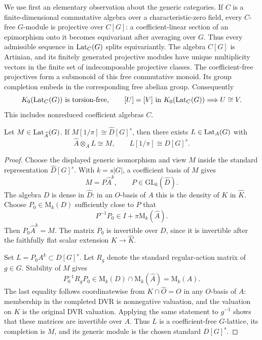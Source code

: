 We use first an elementary observation about the generic categories.
If $C$ is a finite-dimensional commutative algebra over a
characteristic-zero field, every $C$-free $G$-module is projective
over $C[G]$: a coefficient-linear section of an epimorphism onto it
becomes equivariant after averaging over $G$.  Thus every admissible
sequence in $\operatorname{Lat}_C(G)$ splits equivariantly.  The algebra $C[G]$
is Artinian, and its finitely generated projective modules have
unique multiplicity vectors in the finite set of indecomposable
projective classes.  The coefficient-free projectives form a
submonoid of this free commutative monoid.  Its group completion
embeds in the corresponding free abelian group.  Consequently
\begin{equation}\label{eq:completion-generic-cancellation}
 K_0(\operatorname{Lat}_C(G))\text{ is torsion-free},\qquad
 [U]=[V]\text{ in }K_0(\operatorname{Lat}_C(G))\Longrightarrow U\cong V.
\end{equation}
This includes nonreduced coefficient algebras $C$.

\begin{lemma}\label{lem:completion-generic-free-algebraization}
Let $M\in\operatorname{Lat}_{\widehat A}(G)$.  If
$M[1/\pi]\cong\widehat D[G]^s$, then there exists
$L\in\operatorname{Lat}_A(G)$ with
\[
 \widehat A\otimes_A L\cong M,
 \qquad L[1/\pi]\cong D[G]^s.
\]
\end{lemma}

\begin{proof}
Choose the displayed generic isomorphism and view $M$ inside the
standard representation $\widehat D[G]^s$.  With $k=s|G|$, a
coefficient basis of $M$ gives
\[
 M=P\widehat A^k,\qquad P\in\mathrm{GL}_k(\widehat D).
\]
The algebra $D$ is dense in $\widehat D$: in an $O$-basis of
$A$ this is the density of $K$ in $\widehat K$.  Choose
$P_0\in\mathrm M_k(D)$ sufficiently close to $P$ that
\[
 P^{-1}P_0\in I+\pi\mathrm M_k(\widehat A).
\]
Then $P_0\widehat A^k=M$.  The matrix $P_0$ is invertible over
$D$, since it is invertible after the faithfully flat scalar
extension $K\to\widehat K$.

Set $L=P_0A^k\subset D[G]^s$.  Let $R_g$ denote the standard
regular-action matrix of $g\in G$.  Stability of $M$ gives
\[
 P_0^{-1}R_gP_0\in\mathrm M_k(D)\cap
                         \mathrm M_k(\widehat A)
                       =\mathrm M_k(A).
\]
The last equality follows coordinatewise from
$K\cap\widehat O=O$ in any $O$-basis of $A$: membership in
the completed DVR is nonnegative valuation, and the valuation on $K$
is the original DVR valuation.
Applying the same statement to $g^{-1}$ shows that these matrices
are invertible over $A$.  Thus $L$ is a coefficient-free
$G$-lattice, its completion is $M$, and its generic module is the
chosen standard $D[G]^s$.
\end{proof}

